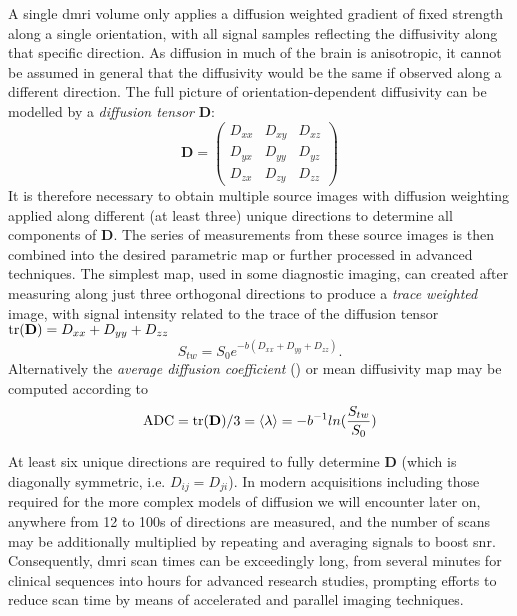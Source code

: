 A single \gls{dmri} volume only applies a diffusion weighted gradient of fixed strength along a single orientation, with all signal samples reflecting the diffusivity along that specific direction.
As diffusion in much of the brain is anisotropic, it cannot be assumed in general that the diffusivity would be the same if observed along a different direction.
The full picture  of orientation-dependent diffusivity can be modelled by a \textit{diffusion tensor} $\mathbf{D}$:
\begin{equation}
  \mathbf{D} = \begin{pmatrix}
                D_{xx} & D_{xy} & D_{xz}\\
                D_{yx} & D_{yy} & D_{yz} \\
                D_{zx} & D_{zy} & D_{zz}
                \end{pmatrix} \label{eq:dt}
\end{equation}
It is therefore necessary to obtain multiple source images with diffusion weighting applied along different (at least three) unique directions to determine all components of $\mathbf{D}$.
The series of measurements from these source images is then combined into the desired parametric map or further processed in advanced techniques.
The simplest map, used in some diagnostic imaging, can created after measuring along just three orthogonal directions to produce a \textit{trace weighted} image, with signal intensity related to the trace of the diffusion tensor $\text{tr(\textbf{D})} = D_{xx} + D_{yy} + D_{zz}$
\begin{equation}
  S_{tw} = S_0 e^{-b(D_{xx} + D_{yy} + D_{zz})}.
\end{equation}
Alternatively the \textit{average diffusion coefficient} () or mean diffusivity map may be computed according to
\begin{equation}
  \text{ADC} = \text{tr(\textbf{D})} / 3 = \langle \lambda \rangle = -b^{-1} ln (\frac{S_{tw}}{S_0})
\end{equation}

At least six unique directions are required to fully determine $\mathbf{D}$ (which is diagonally symmetric, i.e. $D_{ij} = D_{ji}$).
In modern acquisitions including those required for the more complex models of diffusion we will encounter later on, anywhere from 12 to 100s of directions are measured, and the number of scans may be additionally multiplied by repeating and averaging signals to boost \gls{snr}.
Consequently, \gls{dmri} scan times can be exceedingly long, from several minutes for clinical sequences into hours for advanced research studies, prompting efforts to reduce scan time by means of accelerated and parallel imaging techniques.

